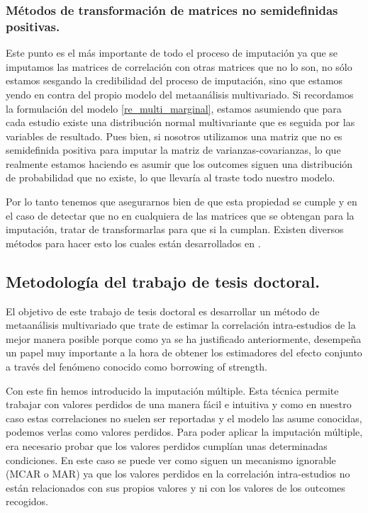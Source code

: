 \documentclass[a4paper,openright,12pt]{report}
\begin{document}
\subsubsection{Métodos de transformación de matrices no semidefinidas positivas.}
Este punto es el más importante de todo el proceso de imputación ya que se imputamos las matrices de correlación con otras matrices que no lo son, no sólo estamos sesgando la credibilidad del proceso de imputación, sino que estamos yendo en contra del propio modelo del metaanálisis multivariado. Si recordamos la formulación del modelo \ref{re_multi_marginal}, estamos asumiendo que para cada estudio existe una distribución normal multivariante que es seguida por las variables de resultado. Pues bien, si nosotros utilizamos una matriz que no es semidefinida positiva para imputar la matriz de varianzas-covarianzas, lo que realmente estamos haciendo es asumir que los outcomes siguen una distribución de probabilidad que no existe, lo que llevaría al traste todo nuestro modelo.

Por lo tanto tenemos que asegurarnos bien de que esta propiedad se cumple y en el caso de detectar que no en cualquiera de las matrices que se obtengan para la imputación, tratar de transformarlas para que si la cumplan. Existen diversos métodos para hacer esto los cuales están desarrollados en \cite{Rousseeuw1993}.



\subsection{Metodología del trabajo de tesis doctoral.}

El objetivo de este trabajo de tesis doctoral es desarrollar un método de metaanálisis multivariado que trate de estimar la correlación intra-estudios de la mejor manera posible porque como ya se ha justificado anteriormente, desempeña un papel muy importante a la hora de obtener los estimadores del efecto conjunto a través del fenómeno conocido como borrowing of strength.

Con este fin hemos introducido la imputación múltiple. Esta técnica permite trabajar con valores perdidos de una manera fácil e intuitiva y como en nuestro caso estas correlaciones no suelen ser reportadas y el modelo las asume conocidas, podemos verlas como valores perdidos. Para poder aplicar la imputación múltiple, era necesario probar que los valores perdidos cumplían unas determinadas condiciones. En este caso se puede ver como siguen un mecanismo ignorable (MCAR o MAR) ya que los valores perdidos en la correlación intra-estudios no están relacionados con sus propios valores y ni con los valores de los outcomes recogidos.
\end{document}
